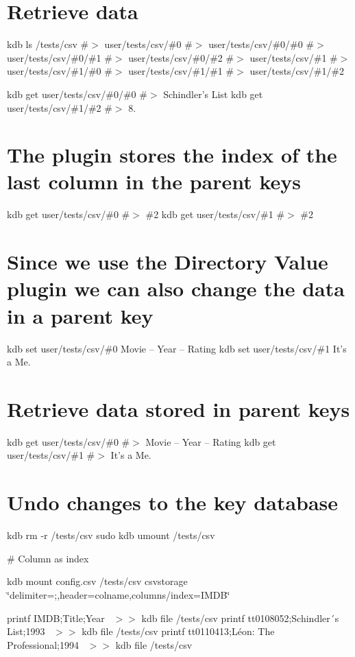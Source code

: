 \section*{Retrieve data}

kdb ls /tests/csv \#$>$ user/tests/csv/\#0 \#$>$ user/tests/csv/\#0/\#0 \#$>$ user/tests/csv/\#0/\#1 \#$>$ user/tests/csv/\#0/\#2 \#$>$ user/tests/csv/\#1 \#$>$ user/tests/csv/\#1/\#0 \#$>$ user/tests/csv/\#1/\#1 \#$>$ user/tests/csv/\#1/\#2

kdb get user/tests/csv/\#0/\#0 \#$>$ Schindler’s List kdb get user/tests/csv/\#1/\#2 \#$>$ 8.

\section*{The plugin stores the index of the last column in the parent keys}

kdb get user/tests/csv/\#0 \#$>$ \#2 kdb get user/tests/csv/\#1 \#$>$ \#2

\section*{Since we use the Directory Value plugin we can also change the data in a parent key}

kdb set user/tests/csv/\#0 \textquotesingle{}Movie – Year – Rating\textquotesingle{} kdb set user/tests/csv/\#1 \textquotesingle{}It’s a Me.\textquotesingle{}

\section*{Retrieve data stored in parent keys}

kdb get user/tests/csv/\#0 \#$>$ Movie – Year – Rating kdb get user/tests/csv/\#1 \#$>$ It’s a Me.

\section*{Undo changes to the key database}

kdb rm -\/r /tests/csv sudo kdb umount /tests/csv 
\begin{DoxyCode}
# Column as index
\end{DoxyCode}
 kdb mount config.\+csv /tests/csv csvstorage \char`\"{}delimiter=;,header=colname,columns/index=\+I\+M\+D\+B\char`\"{}

printf \textquotesingle{}I\+M\+DB;Title;Year~\newline
\textquotesingle{} $>$$>$ {\ttfamily kdb file /tests/csv} printf \textquotesingle{}tt0108052;Schindler´s List;1993~\newline
\textquotesingle{} $>$$>$ {\ttfamily kdb file /tests/csv} printf \textquotesingle{}tt0110413;Léon\+: The Professional;1994~\newline
\textquotesingle{} $>$$>$ {\ttfamily kdb file /tests/csv}

